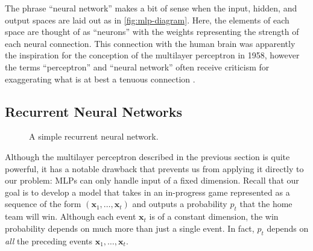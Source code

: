 The phrase ``neural network'' makes a bit of sense when the input, hidden, and output spaces are laid out as in \autoref{fig:mlp-diagram}. Here, the elements of each space are thought of as ``neurons'' with the weights representing the strength of each neural connection.
This connection with the human brain was apparently the inspiration for the conception of the multilayer perceptron in 1958, however the terms ``perceptron'' and ``neural network'' often receive criticism for exaggerating what is at best a tenuous connection \cite[\S 13.2.7]{PML}.

\subsection{Recurrent Neural Networks}

\begin{figure}[t]
	\centering

	\caption{A simple recurrent neural network.}
	\label{fig:simple-rnn}
\end{figure}

Although the multilayer perceptron described in the previous section is quite powerful, it has a notable drawback that prevents us from applying it directly to our problem: MLPs can only handle input of a fixed dimension. Recall that our goal is to develop a model that takes in an in-progress game represented as a sequence of the form $(\mathbf x_1, \ldots, \mathbf x_t)$ and outputs a probability $p_t$ that the home team will win. Although each event $\mathbf x_t$ is of a constant dimension, the win probability depends on much more than just a single event. In fact, $p_t$ depends on \emph{all} the preceding events $\mathbf x_1, \ldots, \mathbf x_t$.

